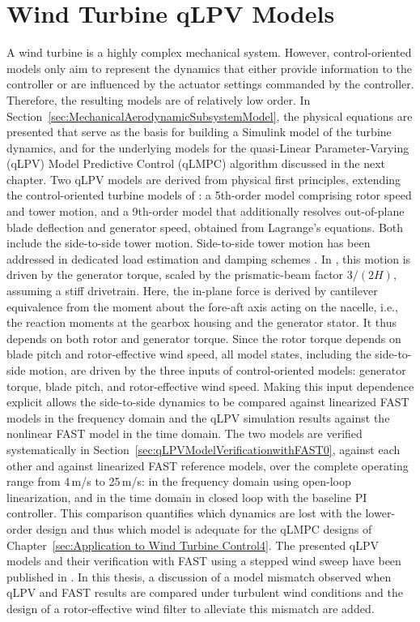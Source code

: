 \chapter{Wind Turbine qLPV Models} \label{sec:WindTurbineqLPVModels}
A wind turbine is a highly complex mechanical system. However, control-oriented models only
aim to represent the dynamics that either provide information to the controller or are influenced
by the actuator settings commanded by the controller. Therefore, the resulting models are of
relatively low order.
%
In Section~\ref{sec:MechanicalAerodynamicSubsystemModel}, the physical equations are presented
that serve as the basis for building a Simulink model of the turbine dynamics, and for the
underlying models for the quasi-Linear Parameter-Varying (qLPV) Model Predictive Control (qLMPC) algorithm discussed in the next chapter. Two qLPV models are
derived from physical first principles, extending the control-oriented turbine models of
\cite{schlipf2013nonlinear, Bianchi2007}: a 5th-order model comprising
rotor speed and tower motion, and a 9th-order model that additionally resolves out-of-plane blade
deflection and generator speed, obtained from Lagrange's equations.
%
Both include the side-to-side tower motion. Side-to-side tower motion has been addressed in dedicated load estimation and damping schemes \cite{mulders2020preventing,
    pamososuryo2022loadestimation, pamososuryo2022individual, fonseca2024windTurbineSideSide}. In \cite{selvam2009feedback}, this motion is driven by the generator torque, scaled by the prismatic-beam factor $3/(2H)$, assuming a stiff drivetrain.
Here, the in-plane force is derived by cantilever equivalence from the moment about the fore-aft
axis acting on the nacelle, i.e., the reaction moments at the gearbox housing and the generator
stator. It thus depends on both rotor and generator torque. Since the rotor torque depends on blade pitch and rotor-effective wind speed, all model states, including the side-to-side motion, are driven by the three inputs of control-oriented models: generator torque, blade pitch, and rotor-effective wind speed. Making this input dependence explicit allows the side-to-side dynamics to be compared
against linearized FAST models in the frequency domain and the qLPV simulation results
against the nonlinear FAST model in the time domain.
%
The two models are verified systematically in
Section~\ref{sec:qLPVModelVerificationwithFAST0}, against each other and against linearized
FAST reference models, over the complete operating range from 4\,m/s to 25\,m/s: in the frequency
domain using open-loop linearization, and in the time domain in closed loop with the
baseline PI controller. This comparison quantifies which dynamics are lost with the lower-order
design and thus which model is adequate for the qLMPC designs of
Chapter~\ref{sec:Application to Wind Turbine Control4}. The presented qLPV models and their verification with FAST using a stepped wind sweep have been published in \cite{dittmer2021velocity}. In this thesis, a discussion of a model mismatch observed when qLPV and FAST results are compared under turbulent wind conditions and the design of a rotor-effective wind filter to alleviate this mismatch are added.


